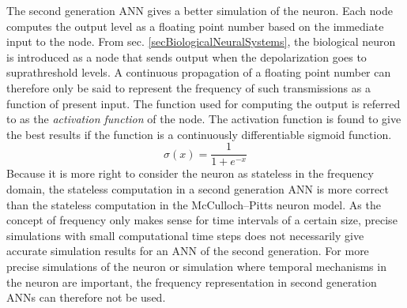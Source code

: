 	The second generation ANN gives a better simulation of the neuron. %
	Each node computes the output level as a floating point number based on the immediate input to the node.
	From sec. \ref{secBiologicalNeuralSystems}, the biological neuron is introduced as a node that sends output when the depolarization goes to suprathreshold levels.
	A continuous propagation of a floating point number can therefore only be said to represent the frequency of such transmissions as a function of present input.
	The function used for computing the output is referred to as the \emph{activation function} of the node.
	The activation function is found to give the best results if the function is a continuously differentiable sigmoid function\cite{HaykinANNbok}.
	\begin{equation}
		\sigma(x)=\frac{1}{1+e^{-x}}   %
	\end{equation}
	Because it is more right to consider the neuron as stateless in the frequency domain, the stateless computation in a second generation ANN is more correct than the stateless computation in the McCulloch--Pitts neuron model.
	As the concept of frequency only makes sense for time intervals of a certain size, precise simulations with small computational time steps does not necessarily give accurate simulation results for an ANN of the second generation. 
	For more precise simulations of the neuron or simulation where temporal mechanisms in the neuron are important, the frequency representation in second generation ANNs can therefore not be used.  %


